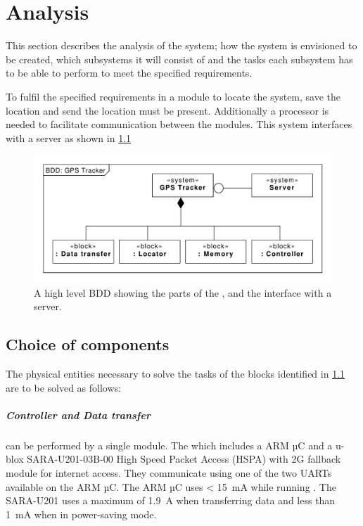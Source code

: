
\chapter{Analysis}
This section describes the analysis of the system; how the system is envisioned to be created, which subsystems it will consist of and the tasks each subsystem has to be able to perform to meet the specified requirements.

To fulfil the specified requirements in  a module to locate the system, save the location and send the location must be present. Additionally a processor is needed to facilitate communication between the modules. This system interfaces with a server as shown in \cref{fig:BDD:unspecified}

\begin{figure}[H]
	\centering
	\includegraphics[width=0.7\linewidth]{gfx/Design/BDD_Unspecified.pdf}
	\caption{A high level BDD showing the parts of the \systemName, and the interface with a server.}
	\label{fig:BDD:unspecified}
\end{figure}

\section{Choice of components}
The physical entities necessary to solve the tasks of the blocks identified in \cref{fig:BDD:unspecified} are to be solved as follows:

\paragraph{Controller and Data transfer} can be performed by a single module. The \MKR which includes a \SAMD ARM µC and a u-blox SARA-U201-03B-00 High Speed Packet Access (HSPA) with 2G fallback module for internet access.
They communicate using one of the two UARTs available on the \SAMD ARM µC.
The \SAMD ARM µC uses \SI{< 15}{\milli\ampere} while running \cite[p.~791-794]{SAMD21}.
The SARA-U201 uses a maximum of \SI{1.9}{\ampere} when transferring data \cite[p.~26]{SARAU201} and less than \SI{1}{\milli\ampere} when in power-saving mode.

